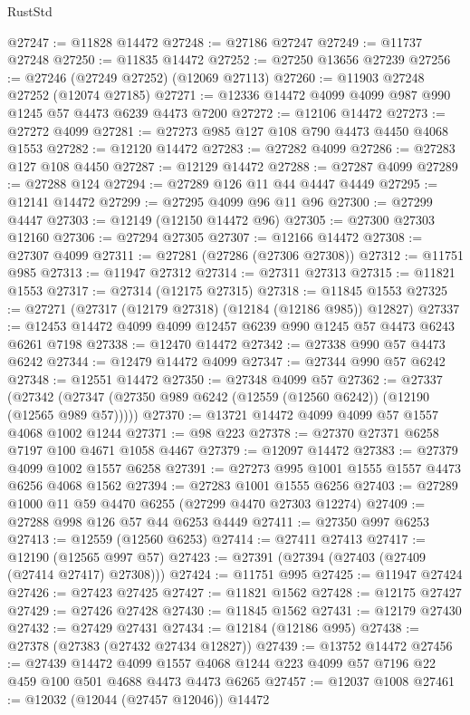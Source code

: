 \begin{lexlean}{RustStd}
\begin{coremodule}
@27247 := @11828 @14472
@27248 := @27186 @27247
@27249 := @11737 @27248
@27250 := @11835 @14472
@27252 := @27250 @13656 @27239
@27256 := @27246 (@27249 @27252) (@12069 @27113)
@27260 := @11903 @27248 @27252 (@12074 @27185)
@27271 := @12336 @14472 @4099 @4099 @987 @990 @1245 @57 @4473 @6239 @4473 @7200
@27272 := @12106 @14472
@27273 := @27272 @4099
@27281 := @27273 @985 @127 @108 @790 @4473 @4450 @4068 @1553
@27282 := @12120 @14472
@27283 := @27282 @4099
@27286 := @27283 @127 @108 @4450
@27287 := @12129 @14472
@27288 := @27287 @4099
@27289 := @27288 @124
@27294 := @27289 @126 @11 @44 @4447 @4449
@27295 := @12141 @14472
@27299 := @27295 @4099 @96 @11 @96
@27300 := @27299 @4447
@27303 := @12149 (@12150 @14472 @96)
@27305 := @27300 @27303 @12160
@27306 := @27294 @27305
@27307 := @12166 @14472
@27308 := @27307 @4099
@27311 := @27281 (@27286 (@27306 @27308))
@27312 := @11751 @985
@27313 := @11947 @27312
@27314 := @27311 @27313
@27315 := @11821 @1553
@27317 := @27314 (@12175 @27315)
@27318 := @11845 @1553
@27325 := @27271 (@27317 (@12179 @27318) (@12184 (@12186 @985)) @12827)
@27337 := @12453 @14472 @4099 @4099 @12457 @6239 @990 @1245 @57 @4473 @6243 @6261 @7198
@27338 := @12470 @14472
@27342 := @27338 @990 @57 @4473 @6242
@27344 := @12479 @14472 @4099
@27347 := @27344 @990 @57 @6242
@27348 := @12551 @14472
@27350 := @27348 @4099 @57
@27362 := @27337
    (@27342 (@27347 (@27350 @989 @6242 (@12559 (@12560 @6242)) (@12190 (@12565 @989 @57)))))
@27370 := @13721 @14472 @4099 @4099 @57 @1557 @4068 @1002 @1244
@27371 := @98 @223
@27378 := @27370 @27371 @6258 @7197 @100 @4671 @1058 @4467
@27379 := @12097 @14472
@27383 := @27379 @4099 @1002 @1557 @6258
@27391 := @27273 @995 @1001 @1555 @1557 @4473 @6256 @4068 @1562
@27394 := @27283 @1001 @1555 @6256
@27403 := @27289 @1000 @11 @59 @4470 @6255 (@27299 @4470 @27303 @12274)
@27409 := @27288 @998 @126 @57 @44 @6253 @4449
@27411 := @27350 @997 @6253
@27413 := @12559 (@12560 @6253)
@27414 := @27411 @27413
@27417 := @12190 (@12565 @997 @57)
@27423 := @27391 (@27394 (@27403 (@27409 (@27414 @27417) @27308)))
@27424 := @11751 @995
@27425 := @11947 @27424
@27426 := @27423 @27425
@27427 := @11821 @1562
@27428 := @12175 @27427
@27429 := @27426 @27428
@27430 := @11845 @1562
@27431 := @12179 @27430
@27432 := @27429 @27431
@27434 := @12184 (@12186 @995)
@27438 := @27378 (@27383 (@27432 @27434 @12827))
@27439 := @13752 @14472
@27456 := @27439
    @14472
    @4099
    @1557
    @4068
    @1244
    @223
    @4099
    @57
    @7196
    @22
    @459
    @100
    @501
    @4688
    @4473
    @4473
    @6265
@27457 := @12037 @1008
@27461 := @12032 (@12044 (@27457 @12046)) @14472

\end{coremodule}
\end{lexlean}
